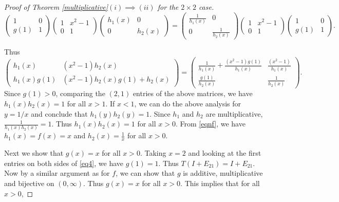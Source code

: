 \documentclass[11pt,reqno]{amsart}
\theoremstyle{plain}
\theoremstyle{definition}
\numberwithin{equation}{section}
\def\cD{\mathcal D}
\begin{document}
\begin{proof}[Proof of Theorem \ref{multiplicative}$(i)\implies (ii)$ for the $2\times2$ case]
	\begin{equation}
		\begin{pmatrix}
			1 & 0 \\ g(1) & 1
		\end{pmatrix} \begin{pmatrix}
			1 & x^2-1 \\ 0 & 1
		\end{pmatrix}\begin{pmatrix}
			h_1(x) & 0 \\ 0 & h_2(x)
		\end{pmatrix}= 
		\begin{pmatrix}
			\frac{1}{h_1(x)} & 0 \\ 0 & \frac{1}{h_2(x)}
		\end{pmatrix} \begin{pmatrix}
			1 & x^2-1 \\ 0 & 1
		\end{pmatrix}\begin{pmatrix}
			1 & 0 \\ g(1) & 1
		\end{pmatrix}.
	\end{equation}
	
	Thus
	\begin{equation}\label{eq4}
		\begin{pmatrix}
			h_1(x) & (x^2-1)h_2(x)\\h_1(x)g(1) & (x^2-1)h_2(x)g(1)+h_2(x)
		\end{pmatrix}= \begin{pmatrix}
			\frac{1}{h_1(x)}+\frac{(x^2-1)g(1)}{h_1(x)} & \frac{(x^2-1)}{h_1(x)} \\\frac{g(1)}{h_2(x)} & \frac{1}{h_2(x)}
		\end{pmatrix}.
	\end{equation}
Since $g(1)>0$, comparing the $(2,1)$ entries of the above matrices, we have $h_1(x)h_2(x)=1$ for all $x>1$.  If $x<1$, we can do the above analysis for $y=1/x$ and conclude that $h_1(y)h_2(y)=1$. Since $h_1$ and $h_2$ are multiplicative, $\frac{1}{h_1(x)h_2(x)}=1$. Thus $h_1(x)h_2(x)=1$ for all $x>0$.  From \eqref{eqnf}, we have $h_1(x)=f(x)=x$ and $h_2(x)=\frac{1}{x}$ for all $x>0$.  %
	
Next we show that $g(x)=x$ for all $x>0$. Taking $x=2$ and looking at the first entries on both sides of \eqref{eq4}, we have $g(1)=1$. Thus $T(I+E_{21})=I+E_{21}$. Now by a similar argument as for $f$, we can show that $g$ is additive, multiplicative and bijective on $(0,\infty)$. Thus $g(x)=x$ for all $x>0$. This implies that for all $x>0$,


\end{proof}
\end{document}
